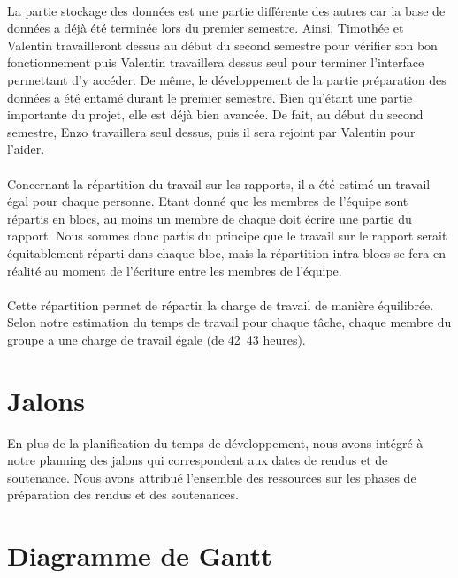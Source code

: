 \paragraph{}

La partie stockage des données est une partie différente des autres car la base de données a déjà été terminée lors du premier semestre. Ainsi, Timothée et Valentin travailleront dessus au début du second semestre pour vérifier son bon fonctionnement puis Valentin travaillera dessus seul pour terminer l’interface permettant d’y accéder. De même, le développement de la partie préparation des données a été entamé durant le premier semestre. Bien qu’étant une partie importante du projet, elle est déjà bien avancée. De fait, au début du second semestre, Enzo travaillera seul dessus, puis il sera rejoint par Valentin pour l’aider.

\paragraph{}

Concernant la répartition du travail sur les rapports, il a été estimé un travail égal pour chaque personne. Etant donné que les membres de l’équipe sont répartis en blocs, au moins un membre de chaque doit écrire une partie du rapport. Nous sommes donc partis du principe que le travail sur le rapport serait équitablement réparti dans chaque bloc, mais la répartition intra-blocs se fera en réalité au moment de l’écriture entre les membres de l’équipe.

\paragraph{}

Cette répartition permet de répartir la charge de travail de manière équilibrée. Selon notre estimation du temps de travail pour chaque tâche, chaque membre du groupe a une charge de travail égale (de 42~43 heures).

\section{Jalons}

En plus de la planification du temps de développement, nous avons intégré à notre planning des jalons qui correspondent aux dates de rendus et de soutenance. Nous avons attribué l’ensemble des ressources sur les phases de préparation des rendus et des soutenances.

\section{Diagramme de Gantt}

